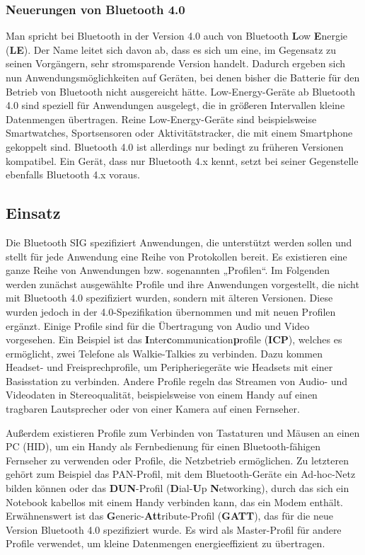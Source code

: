 \begin{multicols}{3}

\subsubsection*{Neuerungen von Bluetooth 4.0}
Man spricht bei Bluetooth in der Version 4.0 auch von Bluetooth \textbf{L}ow \textbf{E}nergie (\textbf{LE}). Der Name leitet sich davon ab, dass es sich um eine, im Gegensatz zu seinen Vorgängern, sehr stromsparende Version handelt. Dadurch ergeben sich nun Anwendungsmöglichkeiten auf Geräten, bei denen bisher die Batterie für den Betrieb von Bluetooth nicht ausgereicht hätte. Low-Energy-Geräte ab Bluetooth 4.0 sind speziell für Anwendungen ausgelegt, die in größeren Intervallen kleine Datenmengen übertragen. Reine Low-Energy-Geräte sind beispielsweise Smartwatches, Sportsensoren oder Aktivitätstracker, die mit einem Smartphone gekoppelt sind. Bluetooth 4.0 ist allerdings nur bedingt zu früheren Versionen kompatibel. Ein Gerät, dass nur Bluetooth 4.x kennt, setzt bei seiner Gegenstelle ebenfalls Bluetooth 4.x voraus. \cite{Bluetooth_4.6}

\subsection*{Einsatz}
Die Bluetooth SIG spezifiziert Anwendungen, die unterstützt werden sollen und stellt für jede Anwendung eine Reihe von Protokollen bereit. Es existieren eine ganze Reihe von Anwendungen bzw. sogenannten „Profilen“. Im Folgenden werden zunächst ausgewählte Profile und ihre Anwendungen vorgestellt, die nicht mit Bluetooth 4.0 spezifiziert wurden, sondern mit älteren Versionen. Diese wurden jedoch in der 4.0-Spezifikation übernommen und mit neuen Profilen ergänzt. Einige Profile sind für die Übertragung von Audio und Video vorgesehen. Ein Beispiel ist das \textbf{I}nter\textbf{c}ommunication\textbf{p}rofile (\textbf{ICP}), welches es ermöglicht, zwei Telefone als Walkie-Talkies zu verbinden. Dazu kommen Headset- und Freisprechprofile, um Peripheriegeräte wie Headsets mit einer Basisstation zu verbinden. Andere Profile regeln das Streamen von Audio- und Videodaten in Stereoqualität, beispielsweise von einem Handy auf einen tragbaren Lautsprecher oder von einer Kamera auf einen Fernseher.

Außerdem existieren Profile zum Verbinden von Tastaturen und Mäusen an einen PC (HID), um ein Handy als Fernbedienung für einen Bluetooth-fähigen Fernseher zu verwenden oder Profile, die Netzbetrieb ermöglichen. Zu letzteren gehört zum Beispiel das PAN-Profil, mit dem Bluetooth-Geräte ein Ad-hoc-Netz bilden können oder das \textbf{DUN}-Profil (\textbf{D}ial-\textbf{U}p \textbf{N}etworking), durch das sich ein Notebook kabellos mit einem Handy verbinden kann, das ein Modem enthält. Erwähnenswert ist das \textbf{G}eneric-\textbf{Att}ribute-Profil (\textbf{GATT}), das für die neue Version Bluetooth 4.0 spezifiziert wurde. Es wird als Master-Profil für andere Profile verwendet, um kleine Datenmengen energieeffizient zu übertragen. \cite{Bluetooth_4.2}


\end{multicols}
